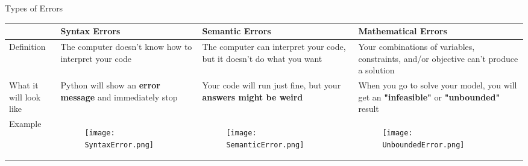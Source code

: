 \documentclass[10pt, aspectratio=169]{beamer}
\begin{document}
\begin{frame}[t]{Types of Errors}
    \begin{tabular}{|p{2cm} || p{3.6cm} | p{3.6cm} | p{3.6cm} |}
        \hline
         & \textbf{Syntax Errors} & \textbf{Semantic Errors} & \textbf{Mathematical Errors} \\
        \hline \hline
        Definition & The computer doesn't know how to interpret your code & The computer can interpret your code, but it doesn't do what you want & Your combinations of variables, constraints, and/or objective can't produce a solution \\
        \hline
        What it will look like & Python will show an \textbf{error message} and immediately stop & Your code will run just fine, but your \textbf{answers might be weird} & When you go to solve your model, you will get an \textbf{"infeasible"} or \textbf{"unbounded"} result \\
        \hline
        Example & \begin{figure}
            \texttt{[image: SyntaxError.png]}
        \end{figure} & \begin{figure}
            \texttt{[image: SemanticError.png]}
        \end{figure} & \begin{figure}
            \texttt{[image: UnboundedError.png]}
        \end{figure} \\
        \hline
    \end{tabular}
\end{frame}
\end{document}
